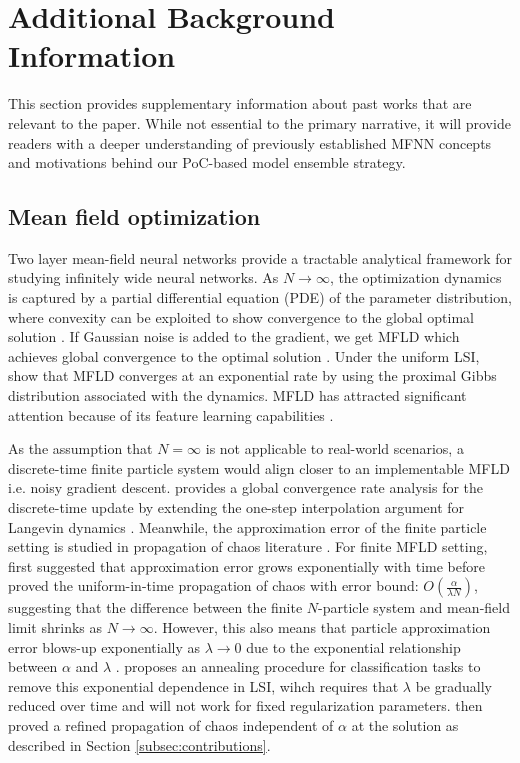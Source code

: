 
\section{Additional Background Information} \label{sec:related_extra}
This section provides supplementary information about past works that are relevant to the paper. While not essential to the primary narrative, it will provide readers with a deeper understanding of previously established MFNN concepts and motivations behind our PoC-based model ensemble strategy.

\subsection{Mean field optimization}
Two layer mean-field neural networks provide a tractable analytical framework for studying infinitely wide neural networks. As $N \rightarrow \infty$, the optimization dynamics is captured by a partial differential equation (PDE) of the parameter distribution, where convexity can be exploited to show convergence to the global optimal solution \citep{chizat2018global, mei2018mean, rotskoff2019global}. If Gaussian noise is added to the gradient, we get MFLD which achieves global convergence to the optimal solution \citep{mei2018mean, hu2019mean}. Under the uniform LSI, \citet{nitanda2022convex, chizat2022mean} show that MFLD converges at an exponential rate by using the proximal Gibbs distribution associated with the dynamics. MFLD has attracted significant attention because of its feature learning capabilities \citep{ suzuki2023featurelearning,mousavi2024learning}.

As the assumption that $N = \infty$ is not applicable to real-world scenarios, a discrete-time finite particle system would align closer to an implementable MFLD i.e. noisy gradient descent. \citet{nitanda2022convex} provides a global convergence rate analysis for the discrete-time update by extending the one-step interpolation argument for Langevin dynamics \citep{vempala2019rapid}. Meanwhile, the approximation error of the finite particle setting is studied in propagation of chaos literature \citep{sznitman1991topics}. For finite MFLD setting, \citet{mei2018mean} first suggested that approximation error grows exponentially with time before \citet{chen2022uniform, suzuki2023convergence} proved the uniform-in-time propagation of chaos with error bound: $O \left( \frac{\alpha}{\lambda N}\right)$, suggesting that the difference between the finite $N$-particle system and mean-field limit shrinks as $N \rightarrow \infty$. However, this also means that particle approximation error blows-up exponentially as $\lambda \rightarrow 0$ due to the exponential relationship between $\alpha$ and $\lambda$ \citep{nitanda2022convex,chizat2022mean,suzuki2023convergence}. \citet{suzuki2023featurelearning} proposes an annealing procedure for classification tasks to remove this exponential dependence in LSI, wihch requires that $\lambda$ be gradually reduced over time and will not work for fixed regularization parameters. \citet{nitanda2024improved, chewi2024uniform} then proved a refined propagation of chaos independent of $\alpha$ at the solution as described in Section \ref{subsec:contributions}.

